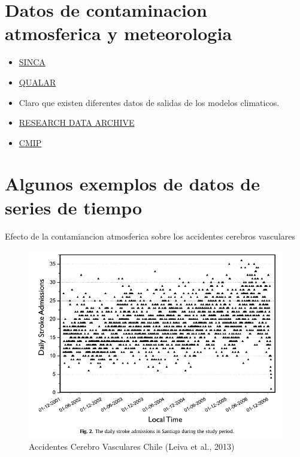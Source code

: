 \documentclass[]{book}
\providecommand{\tightlist}{%
  \setlength{\itemsep}{0pt}\setlength{\parskip}{0pt}}
\begin{document}
\hypertarget{datos-de-contaminacion-atmosferica-y-meteorologia}{%
\section{Datos de contaminacion atmosferica y meteorologia}\label{datos-de-contaminacion-atmosferica-y-meteorologia}}

\begin{itemize}
\tightlist
\item
  \href{https://sinca.mma.gob.cl/}{SINCA}
\item
  \href{https://qualar.cetesb.sp.gov.br/qualar/home.do}{QUALAR}
\item
  Claro que existen diferentes datos de salidas de los modelos climaticos.
\item
  \href{https://rda.ucar.edu/}{RESEARCH DATA ARCHIVE}
\item
  \href{https://esgf-node.llnl.gov/projects/cmip6/}{CMIP}
\end{itemize}

\hypertarget{algunos-exemplos-de-datos-de-series-de-tiempo}{%
\section{Algunos exemplos de datos de series de tiempo}\label{algunos-exemplos-de-datos-de-series-de-tiempo}}

Efecto de la contamiancion atmosferica sobre los accidentes cerebros vasculares

\begin{figure}
\includegraphics[width=10.92in]{figs/strokes} \caption{Accidentes Cerebro Vasculares Chile (Leiva et al., 2013)}\label{fig:unnamed-chunk-3}
\end{figure}
\end{document}
